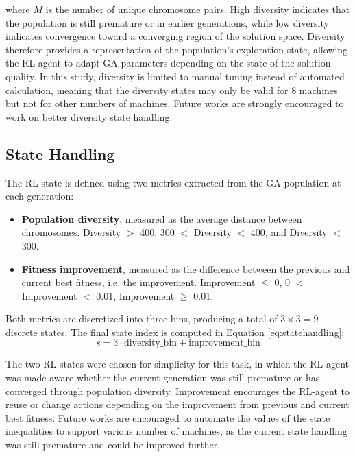 \documentclass{article}
\begin{document}
where $M$ is the number of unique chromosome pairs. High diversity indicates that the population is still premature or in earlier generations, while low diversity indicates convergence toward a converging region of the solution space. Diversity therefore provides a representation of the population’s exploration state, allowing the RL agent to adapt GA parameters depending on the state of the solution quality. In this study, diversity is limited to manual tuning instead of automated calculation, meaning that the diversity states may only be valid for 8 machines but not for other numbers of machines. Future works are strongly encouraged to work on better diversity state handling.

\subsection{State Handling}

The RL state is defined using two metrics extracted from the GA population at each generation:
\begin{itemize}
    \item \textbf{Population diversity}, measured as the average distance between chromosomes. Diversity $>$ 400, 300 $<$ Diversity $<$ 400, and Diversity $<$ 300.
    \item \textbf{Fitness improvement}, measured as the difference between the previous and current best fitness, i.e. the improvement. Improvement $\leq$ 0, 0 $<$ Improvement $<$ 0.01, Improvement $\geq$ 0.01.
\end{itemize}

Both metrics are discretized into three bins, producing a total of $3 \times 3 = 9$ discrete states. The final state index is computed in Equation \ref{eq:statehandling}:
\begin{equation}
    s = 3 \cdot \text{diversity\_bin} + \text{improvement\_bin}
    \label{eq:statehandling}
\end{equation}

The two RL states were chosen for simplicity for this task, in which the RL agent was made aware whether the current generation was still premature or has converged through population diversity. Improvement encourages the RL-agent to reuse or change actions depending on the improvement from previous and current best fitness. Future works are encouraged to automate the values of the state inequalities to support various number of machines, as the current state handling was still premature and could be improved further.
\end{document}
